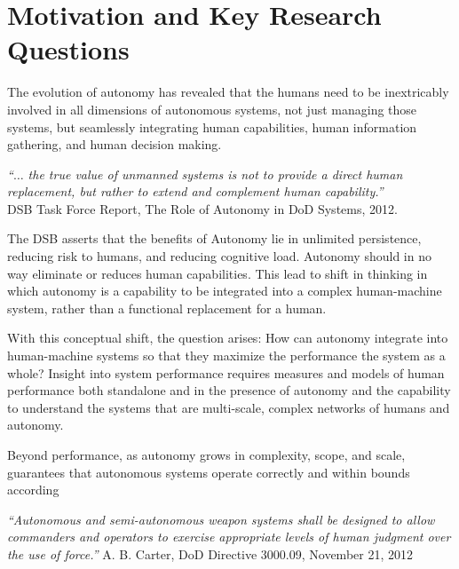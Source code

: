
\section*{Motivation and Key Research Questions}

The evolution of autonomy has revealed that the humans need to be inextricably involved in all dimensions of autonomous systems, not 
just managing those systems, but seamlessly integrating human capabilities, human information gathering, and human decision making.
\begin{center}
\parbox[c]{6in}{
{\em ``$\ldots$ the true value of unmanned systems is not to provide a direct human replacement, but rather to extend and complement human capability.''} \\
\hspace*{20pt} DSB Task Force Report, The Role of Autonomy in DoD Systems, 2012.
}
\end{center}
The DSB asserts that the benefits of Autonomy lie in unlimited persistence, reducing risk to humans, and reducing cognitive load.
Autonomy should in no way eliminate or reduces human capabilities.  This lead to shift in thinking in which autonomy is a capability to
be integrated into a complex human-machine system,  rather than a functional replacement for a human.

With this conceptual shift, the question arises: How can autonomy integrate into human-machine systems so that they maximize the 
performance the system as a whole?  Insight into system performance requires measures and models of human performance 
both standalone and in the presence of autonomy and the capability to understand the systems that are multi-scale, complex
networks of humans and autonomy.

Beyond performance, as autonomy grows in complexity, scope, and scale, guarantees that autonomous systems 
operate correctly and within bounds according
\begin{center}
\parbox[c]{6in}{
{\em ``Autonomous and semi-autonomous weapon systems shall be designed to allow 
commanders and operators to exercise appropriate levels of human judgment over the use of force.''}
\hspace*{20pt} A. B. Carter, DoD Directive 3000.09, November 21, 2012
}
\end{center}




